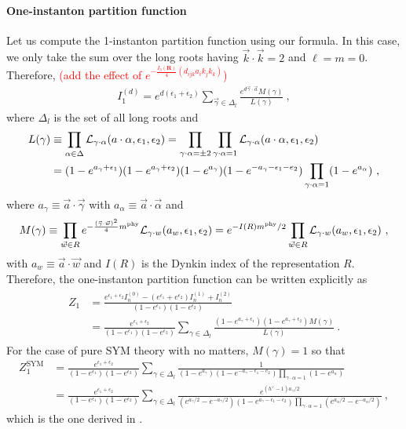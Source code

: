 \documentclass[letterpaper, 11pt]{article}
\newcommand{\nn}{\nonumber}
\def\CL{{\cal L}}
\def\a{\alpha}
\def\g{\gamma}
\def\e{\epsilon}
\begin{document}
\paragraph{One-instanton partition function}
Let us compute the 1-instanton partition function using our formula. In this case, we only take the sum over the long roots having $\vec{k}\cdot \vec{k} = 2$ and $\ell = m = 0$. Therefore, \textcolor{red}{(add the effect of $e^{- \frac{I_3(\mathbf{R})}{4} (d_{ijk} a_i k_j k_k )}$)}
\begin{align}
 I_1^{(d)} = e^{d(\e_1+\e_2)} \sum_{\vec{\g} \in \Delta_l} \frac{e^{d \vec{\g} \cdot \vec{a} } M(\g) }{L(\g)} \ , 
\end{align} 
where $\Delta_l$ is the set of all long roots and
\begin{align}
\begin{split}
 L(\g) &\equiv \prod_{\a \in \Delta} \CL_{\g \cdot \a} (a \cdot \a, \e_1, \e_2) 
  = \prod_{\g \cdot \a = \pm 2} \prod_{\g \cdot \a = 1} \CL_{\g \cdot \a} (a \cdot \a, \e_1, \e_2) \\
 & = (1-e^{a_\g+\e_1})(1-e^{a_\g+\e_2})(1-e^{a_\g}) (1-e^{-a_\g-\e_1-e_2}) \prod_{\g \cdot \a = 1} (1-e^{a_\a }) \ , 
\end{split}
\end{align}
where $a_\g \equiv \vec{a}\cdot \vec{\g}$ with $a_\a \equiv \vec{a}\cdot \vec{\a}$ and 
\begin{align}
 M(\g) \equiv \prod_{\vec{w} \in R} e^{-\frac{(\vec{\g} \cdot \vec{w})^2}{4}m^{\textrm{phy}} }\CL_{\g \cdot w} (a_w, \e_1, \e_2)  = e^{-I(R)m^{\textrm{phy}}/2} \prod_{\vec{w} \in R} \CL_{\g \cdot w} (a_w, \e_1, \e_2) \ , 
\end{align}
with $a_w \equiv \vec{a} \cdot \vec{w}$ and $I(R)$ is the Dynkin index of the representation $R$. 
Therefore, the one-instanton partition function can be written explicitly as 
\begin{align}
\begin{split}
Z_1 &= \frac{e^{\e_1 + \e_2} I_n^{(0)} - (e^{\e_1} + e^{ \e_2}) I_n^{(1)} + I_n^{(2)} }{(1-e^{\e_1})(1-e^{\e_2})} \\
&= \frac{e^{\e_1+\e_2} }{(1-e^{\e_1})(1-e^{\e_2})} \sum_{\g \in \Delta_l} \frac{(1-e^{a_\g+\e_1})(1-e^{a_\g+\e_2}) M(\g) }{L(\g)} \ . 
\end{split}
\end{align}
For the case of pure SYM theory with no matters, $M(\g)=1$ so that 
\begin{align}
Z_1^{\textrm{SYM}} &= \frac{e^{\e_1+\e_2} }{(1-e^{\e_1})(1-e^{\e_2})} \sum_{\g \in \Delta_l} \frac{1}{ (1 - e^{a_\g})(1-e^{-a_\g-\e_1-e_2}) \prod_{\g \cdot \a = 1} (1-e^{a_\a })} \\
&= \frac{e^{\e_1+\e_2} }{(1-e^{\e_1})(1-e^{\e_2})} \sum_{\g \in \Delta_l} \frac{e^{(h^\vee -1)a_\g/2}}{ (e^{a_\g/2} - e^{-a_\g/2})(1-e^{a_\g-\e_1-\e_2}) {\prod_{\g \cdot \a = 1} (e^{a_\a/2}-e^{-a_\a/2 })} } \ , \nn
\end{align}
which is the one derived in \cite{Keller:2011ek, Keller:2012da}. 
\end{document}
